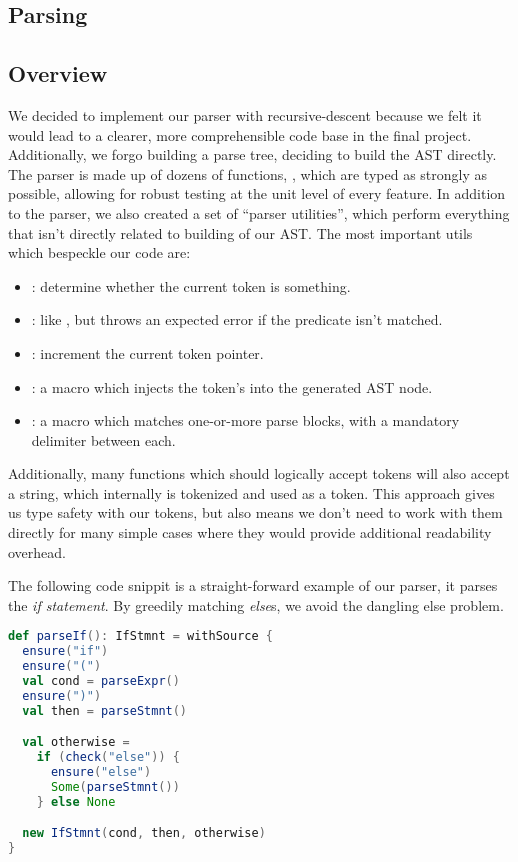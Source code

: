 \documentclass{article}
\begin{document}
\subsection{Parsing}

\subsection{Overview}

We decided to implement our parser with recursive-descent because we felt it would lead to a clearer, more
comprehensible code base in the final project. Additionally, we forgo building a parse tree, deciding to build the AST
directly. The parser is made up of dozens of functions, , which are typed as strongly as possible,
allowing for robust testing at the unit level of every feature. In addition to the parser, we also created a set of
``parser utilities'', which perform everything that isn't directly related to building of our AST. The most important
utils which bespeckle our code are:

\begin{itemize}
    \item {}: determine whether the current token is something.
    \item {}: like , but throws an expected error if the predicate isn't matched.
    \item {}: increment the current token pointer.
    \item {}: a macro which injects the token's  into the generated AST node.
    \item {}: a macro which matches one-or-more parse blocks, with a mandatory delimiter between each.
\end{itemize}

Additionally, many functions which should logically accept tokens will also accept a string, which internally is
tokenized and used as a token. This approach gives us type safety with our tokens, but also means we don't need to work
with them directly for many simple cases where they would provide additional readability overhead.

The following code snippit is a straight-forward example of our parser, it parses the \emph{if statement}. By greedily
matching \emph{else}s, we avoid the dangling else problem.

\begin{lstlisting}[language=Scala]
def parseIf(): IfStmnt = withSource {
  ensure("if")
  ensure("(")
  val cond = parseExpr()
  ensure(")")
  val then = parseStmnt()

  val otherwise =
    if (check("else")) {
      ensure("else")
      Some(parseStmnt())
    } else None

  new IfStmnt(cond, then, otherwise)
}
\end{lstlisting}
\end{document}
